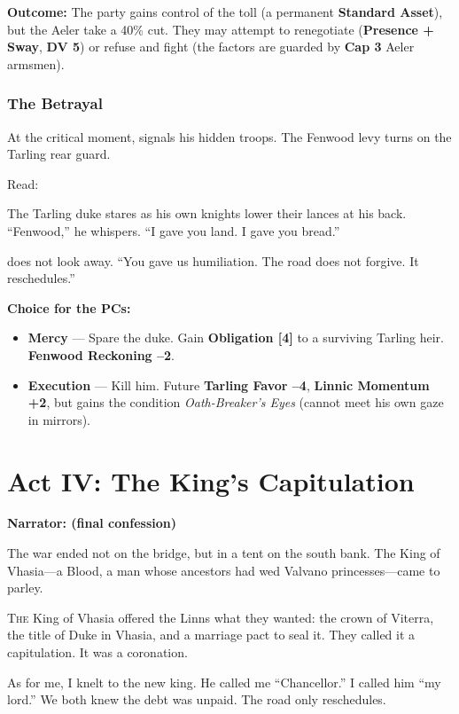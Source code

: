 \documentclass[11pt,a5paper]{book}
\newcommand{\dv}[1]{\textbf{DV #1}}
\newcommand{\timer}[1]{\textbf{[#1]}}
\newcommand{\condition}[1]{\textit{#1}}
\begin{document}
\textbf{Outcome:} The party gains control of the toll (a permanent \textbf{Standard Asset}), but the Aeler take a 40\% cut. They may attempt to renegotiate (\textbf{Presence + Sway}, \dv{5}) or refuse and fight (the factors are guarded by \textbf{Cap 3} Aeler armsmen).

\subsection*{The Betrayal}

At the critical moment, \aldric{} signals his hidden troops. The Fenwood levy turns on the Tarling rear guard.

Read:
\begin{quoting}
The Tarling duke stares as his own knights lower their lances at his back. ``Fenwood,'' he whispers. ``I gave you land. I gave you bread.''

\aldric{} does not look away. ``You gave us humiliation. The road does not forgive. It reschedules.''
\end{quoting}

\textbf{Choice for the PCs:}
\begin{itemize}[leftmargin=*]
\item \textbf{Mercy} --- Spare the duke. Gain \textbf{Obligation \timer{4}} to a surviving Tarling heir. \textbf{Fenwood Reckoning --2}.
\item \textbf{Execution} --- Kill him. Future \textbf{Tarling Favor --4}, \textbf{Linnic Momentum +2}, but \aldric{} gains the condition \condition{Oath-Breaker's Eyes} (cannot meet his own gaze in mirrors).
\end{itemize}

\clearpage

\chapter{Act IV: The King's Capitulation}
\textbf{Narrator: \aldric{} (final confession)}

\epigraph{The war ended not on the bridge, but in a tent on the south bank. The King of Vhasia---a Blood, a man whose ancestors had wed Valvano princesses---came to parley.}{\aldric}

\lettrine{T}{he} King of Vhasia offered the Linns what they wanted: the crown of Viterra, the title of Duke in Vhasia, and a marriage pact to seal it. They called it a capitulation. It was a coronation.

As for me, I knelt to the new king. He called me ``Chancellor.'' I called him ``my lord.'' We both knew the debt was unpaid. The road only reschedules.
\end{document}

